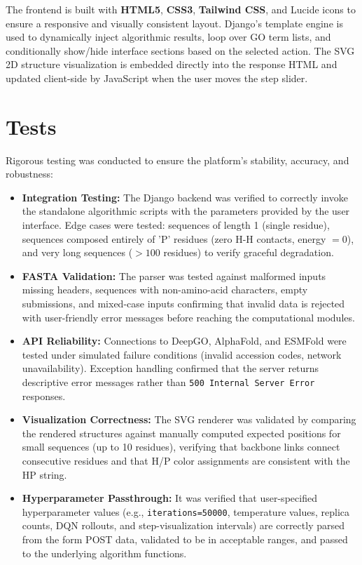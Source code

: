 The frontend is built with \textbf{HTML5}, \textbf{CSS3}, \textbf{Tailwind CSS}, and Lucide icons to ensure a responsive and visually consistent layout. Django's template engine is used to dynamically inject algorithmic results, loop over GO term lists, and conditionally show/hide interface sections based on the selected action. The SVG 2D structure visualization is embedded directly into the response HTML and updated client-side by JavaScript when the user moves the step slider.

\section{Tests}
\label{cap3:sec_tests}

Rigorous testing was conducted to ensure the platform's stability, accuracy, and robustness:

\begin{itemize}
    \item \textbf{Integration Testing:} The Django backend was verified to correctly invoke the standalone algorithmic scripts with the parameters provided by the user interface. Edge cases were tested: sequences of length 1 (single residue), sequences composed entirely of 'P' residues (zero H-H contacts, energy $= 0$), and very long sequences ($> 100$ residues) to verify graceful degradation.

    \item \textbf{FASTA Validation:} The parser was tested against malformed inputs missing headers, sequences with non-amino-acid characters, empty submissions, and mixed-case inputs confirming that invalid data is rejected with user-friendly error messages before reaching the computational modules.

    \item \textbf{API Reliability:} Connections to DeepGO, AlphaFold, and ESMFold were tested under simulated failure conditions (invalid accession codes, network unavailability). Exception handling confirmed that the server returns descriptive error messages rather than \texttt{500 Internal Server Error} responses.

    \item \textbf{Visualization Correctness:} The SVG renderer was validated by comparing the rendered structures against manually computed expected positions for small sequences (up to 10 residues), verifying that backbone links connect consecutive residues and that H/P color assignments are consistent with the HP string.

    \item \textbf{Hyperparameter Passthrough:} It was verified that user-specified hyperparameter values (e.g., \texttt{iterations=50000}, temperature values, replica counts, DQN rollouts, and step-visualization intervals) are correctly parsed from the form POST data, validated to be in acceptable ranges, and passed to the underlying algorithm functions.
\end{itemize}

